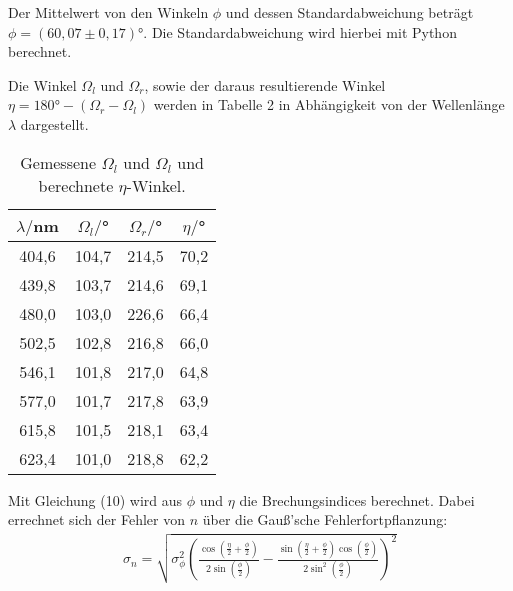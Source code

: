 Der Mittelwert von den Winkeln $\phi$ und dessen Standardabweichung beträgt $\phi = (60,07 \pm 0,17)°$. Die Standardabweichung wird hierbei
mit Python berechnet.


Die Winkel $\Omega_l$ und $\Omega_r$, sowie der daraus resultierende Winkel $\eta = 180° - (\Omega_r-\Omega_l)$ werden in Tabelle 2 in Abhängigkeit von der
Wellenlänge $\lambda$ dargestellt.



\begin{table}[H]
  \centering
  \caption{Gemessene $\Omega_l$ und $\Omega_l$ und berechnete $\eta$-Winkel.}
  \label{tab:spannung1}
  \begin{tabular}{c c c c}
    \toprule
  $\lambda/$nm &  $\Omega_l/$° & $\Omega_r/$° & $\eta/$° \\
    \midrule
    404,6  & 104,7  &  214,5 & 70,2     \\
    439,8  & 103,7  &  214,6 & 69,1     \\
    480,0  & 103,0  &  226,6 & 66,4      \\
    502,5  & 102,8  &  216,8 & 66,0      \\
    546,1  & 101,8  &  217,0 & 64,8      \\
    577,0  & 101,7  &  217,8 & 63,9      \\
    615,8  & 101,5  &  218,1 & 63,4      \\
    623,4  & 101,0  &  218,8 & 62,2      \\
    \bottomrule
  \end{tabular}
\end{table}

Mit Gleichung (10) wird aus $\phi$ und $\eta$ die Brechungsindices berechnet. Dabei errechnet sich der Fehler von $n$ über die Gauß'sche Fehlerfortpflanzung:
\begin{align*}
  \sigma_n = \sqrt{
   \sigma_{\phi}^{2} \left(\frac{\cos{\left (\frac{\eta}{2} + \frac{\phi}{2} \right )}}{2 \sin{\left (\frac{\phi}{2} \right )}} - \frac{\sin{\left (\frac{\eta}{2}
  + \frac{\phi}{2} \right )} \cos{\left (\frac{\phi}{2} \right )}}{2 \sin^{2}{\left (\frac{\phi}{2} \right )}}\right)^{2}}
\end{align*}



